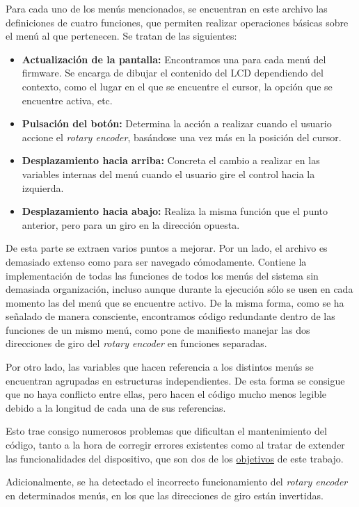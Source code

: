 Para cada uno de los menús mencionados, se encuentran en este archivo las definiciones de cuatro funciones, que permiten realizar operaciones básicas sobre el menú al que pertenecen. Se tratan de las siguientes:

\begin{itemize}
    \item\textbf{Actualización de la pantalla:} Encontramos una para cada menú del firmware. Se encarga de dibujar el contenido del LCD dependiendo del contexto, como el lugar en el que se encuentre el cursor, la opción que se encuentre activa, etc.
    \item\textbf{Pulsación del botón:} Determina la acción a realizar cuando el usuario accione el \textit{rotary encoder}, basándose una vez más en la posición del cursor.
    \item\textbf{Desplazamiento hacia arriba:} Concreta el cambio a realizar en las variables internas del menú cuando el usuario gire el control hacia la izquierda.
    \item\textbf{Desplazamiento hacia abajo:} Realiza la misma función que el punto anterior, pero para un giro en la dirección opuesta.
\end{itemize}

De esta parte se extraen varios puntos a mejorar. Por un lado, el archivo es demasiado extenso como para ser navegado cómodamente. Contiene la implementación de todas las funciones de todos los menús del sistema sin demasiada organización, incluso aunque durante la ejecución sólo se usen en cada momento las del menú que se encuentre activo. De la misma forma, como se ha señalado de manera consciente, encontramos código redundante dentro de las funciones de un mismo menú, como pone de manifiesto manejar las dos direcciones de giro del \textit{rotary encoder} en funciones separadas.

Por otro lado, las variables que hacen referencia a los distintos menús se encuentran agrupadas en estructuras independientes. De esta forma se consigue que no haya conflicto entre ellas, pero hacen el código mucho menos legible debido a la longitud de cada una de sus referencias.

Esto trae consigo numerosos problemas que dificultan el mantenimiento del código, tanto a la hora de corregir errores existentes como al tratar de extender las funcionalidades del dispositivo, que son dos de los \hyperref[sec:objetivos]{objetivos} de este trabajo.

Adicionalmente, se ha detectado el incorrecto funcionamiento del \textit{rotary encoder} en determinados menús, en los que las direcciones de giro están invertidas.

